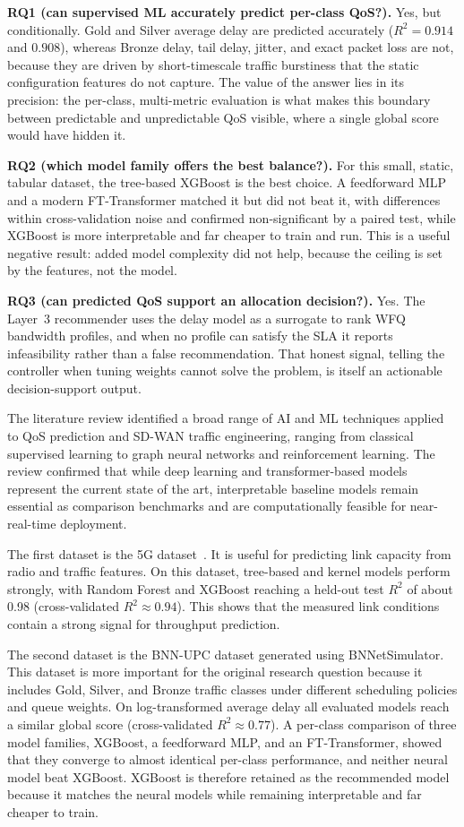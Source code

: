 \documentclass[a4paper,12pt]{Classes/RoboticsLaTeX}
\begin{document}
\textbf{RQ1 (can supervised ML accurately predict per-class QoS?).} Yes, but conditionally. Gold and Silver average delay are predicted accurately ($R^2 = 0.914$ and $0.908$), whereas Bronze delay, tail delay, jitter, and exact packet loss are not, because they are driven by short-timescale traffic burstiness that the static configuration features do not capture. The value of the answer lies in its precision: the per-class, multi-metric evaluation is what makes this boundary between predictable and unpredictable QoS visible, where a single global score would have hidden it.

\textbf{RQ2 (which model family offers the best balance?).} For this small, static, tabular dataset, the tree-based XGBoost is the best choice. A feedforward MLP and a modern FT-Transformer matched it but did not beat it, with differences within cross-validation noise and confirmed non-significant by a paired test, while XGBoost is more interpretable and far cheaper to train and run. This is a useful negative result: added model complexity did not help, because the ceiling is set by the features, not the model.

\textbf{RQ3 (can predicted QoS support an allocation decision?).} Yes. The Layer~3 recommender uses the delay model as a surrogate to rank WFQ bandwidth profiles, and when no profile can satisfy the SLA it reports infeasibility rather than a false recommendation. That honest signal, telling the controller when tuning weights cannot solve the problem, is itself an actionable decision-support output.

The literature review identified a broad range of AI and ML techniques applied to QoS prediction and SD-WAN traffic engineering, ranging from classical supervised learning to graph neural networks and reinforcement learning. The review confirmed that while deep learning and transformer-based models represent the current state of the art, interpretable baseline models remain essential as comparison benchmarks and are computationally feasible for near-real-time deployment.

The first dataset is the 5G dataset~\cite{raffeck2024zenodo}. It is useful for predicting link capacity from radio and traffic features. On this dataset, tree-based and kernel models perform strongly, with Random Forest and XGBoost reaching a held-out test $R^2$ of about 0.98 (cross-validated $R^2 \approx 0.94$). This shows that the measured link conditions contain a strong signal for throughput prediction.

The second dataset is the BNN-UPC dataset generated using BNNetSimulator. This dataset is more important for the original research question because it includes Gold, Silver, and Bronze traffic classes under different scheduling policies and queue weights. On log-transformed average delay all evaluated models reach a similar global score (cross-validated $R^2 \approx 0.77$). A per-class comparison of three model families, XGBoost, a feedforward MLP, and an FT-Transformer, showed that they converge to almost identical per-class performance, and neither neural model beat XGBoost. XGBoost is therefore retained as the recommended model because it matches the neural models while remaining interpretable and far cheaper to train.
\end{document}
